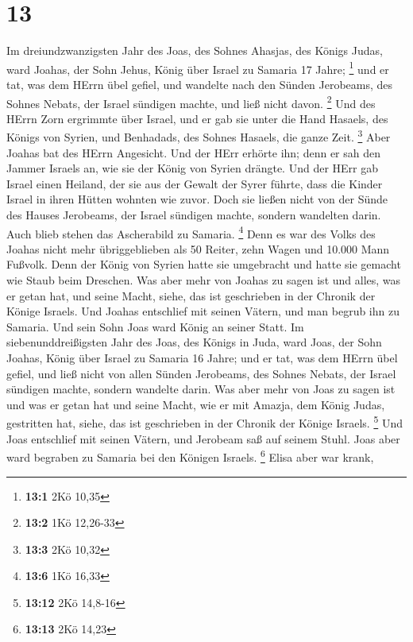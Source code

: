 \hypertarget{section-3}{%
\section{13}\label{section-3}}

 Im dreiundzwanzigsten Jahr des Joas, des Sohnes Ahasjas,
des Königs Judas, ward Joahas, der Sohn Jehus, König über Israel zu
Samaria 17 Jahre; \footnote{\textbf{13:1} 2Kö 10,35}  und er
tat, was dem HErrn übel gefiel, und wandelte nach den Sünden Jerobeams,
des Sohnes Nebats, der Israel sündigen machte, und ließ nicht davon.
\footnote{\textbf{13:2} 1Kö 12,26-33}  Und des HErrn Zorn
ergrimmte über Israel, und er gab sie unter die Hand Hasaels, des Königs
von Syrien, und Benhadads, des Sohnes Hasaels, die ganze Zeit.
\footnote{\textbf{13:3} 2Kö 10,32}  Aber Joahas bat des
HErrn Angesicht. Und der HErr erhörte ihn; denn er sah den Jammer
Israels an, wie sie der König von Syrien drängte.  Und der
HErr gab Israel einen Heiland, der sie aus der Gewalt der Syrer führte,
dass die Kinder Israel in ihren Hütten wohnten wie zuvor. 
Doch sie ließen nicht von der Sünde des Hauses Jerobeams, der Israel
sündigen machte, sondern wandelten darin. Auch blieb stehen das
Ascherabild zu Samaria. \footnote{\textbf{13:6} 1Kö 16,33} 
Denn es war des Volks des Joahas nicht mehr übriggeblieben als 50
Reiter, zehn Wagen und 10.000 Mann Fußvolk. Denn der König von Syrien
hatte sie umgebracht und hatte sie gemacht wie Staub beim Dreschen.
 Was aber mehr von Joahas zu sagen ist und alles, was er
getan hat, und seine Macht, siehe, das ist geschrieben in der Chronik
der Könige Israels.  Und Joahas entschlief mit seinen
Vätern, und man begrub ihn zu Samaria. Und sein Sohn Joas ward König an
seiner Statt.  Im siebenunddreißigsten Jahr des Joas, des
Königs in Juda, ward Joas, der Sohn Joahas, König über Israel zu Samaria
16 Jahre;  und er tat, was dem HErrn übel gefiel, und ließ
nicht von allen Sünden Jerobeams, des Sohnes Nebats, der Israel sündigen
machte, sondern wandelte darin.  Was aber mehr von Joas zu
sagen ist und was er getan hat und seine Macht, wie er mit Amazja, dem
König Judas, gestritten hat, siehe, das ist geschrieben in der Chronik
der Könige Israels. \footnote{\textbf{13:12} 2Kö 14,8-16} 
Und Joas entschlief mit seinen Vätern, und Jerobeam saß auf seinem
Stuhl. Joas aber ward begraben zu Samaria bei den Königen Israels.
\footnote{\textbf{13:13} 2Kö 14,23}  Elisa aber war krank,
